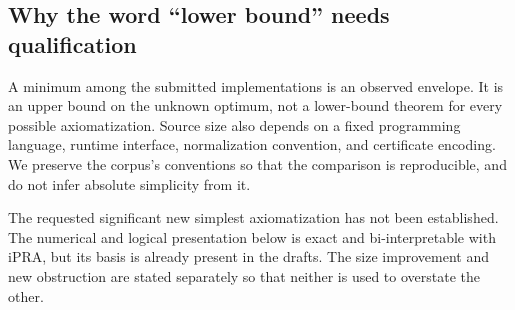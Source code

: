 \subsection{Why the word ``lower bound'' needs qualification}

A minimum among the submitted implementations is an observed envelope.
It is an upper bound on the unknown optimum, not a lower-bound theorem
for every possible axiomatization. Source size also depends on a fixed
programming language, runtime interface, normalization convention, and
certificate encoding. We preserve the corpus's conventions so that the
comparison is reproducible, and do not infer absolute simplicity from it.

The requested significant new simplest axiomatization has not been
established. The numerical and logical presentation below is exact and
bi-interpretable with iPRA, but its basis is already present in the
drafts. The size improvement and new obstruction are stated separately
so that neither is used to overstate the other.
